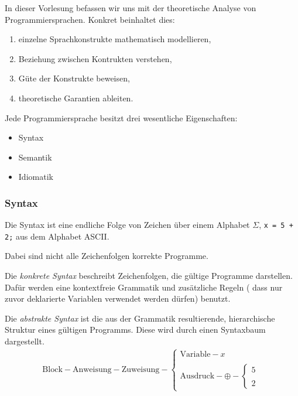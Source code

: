 \par\bigskip
In dieser Vorlesung befassen wir uns mit der theoretische Analyse von Programmiersprachen. Konkret beinhaltet dies:
\begin{enumerate}
    \item einzelne Sprachkonstrukte mathematisch modellieren,
    \item Beziehung zwischen Kontrukten verstehen,
    \item Güte der Konstrukte beweisen,
    \item theoretische Garantien ableiten.
\end{enumerate}

\par\bigskip
Jede Programmiersprache besitzt drei wesentliche Eigenschaften:
\begin{itemize}
    \item Syntax
    \item Semantik
    \item Idiomatik
\end{itemize}



\subsubsection{Syntax}

Die Syntax ist eine endliche Folge von Zeichen über einem Alphabet $\Sigma$, \zb{} \texttt{x = 5 + 2;} aus dem Alphabet ASCII.

Dabei sind nicht alle Zeichenfolgen korrekte Programme.

Die \emph{konkrete Syntax} beschreibt Zeichenfolgen, die gültige Programme darstellen. Dafür werden eine kontextfreie Grammatik und zusätzliche Regeln (\zb{} dass nur zuvor deklarierte Variablen verwendet werden dürfen) benutzt.

Die \emph{abstrakte Syntax} ist die aus der Grammatik resultierende, hierarchische Struktur eines gültigen Programms. Diese wird durch einen Syntaxbaum dargestellt.
\begin{align*}
    \text{Block} - \text{Anweisung} - \text{Zuweisung} - \begin{cases}
        \text{Variable} - x \\
        \\
        \text{Ausdruck} - \oplus - \begin{cases}
            5 \\
            \\
            2
        \end{cases}
    \end{cases}
\end{align*}

